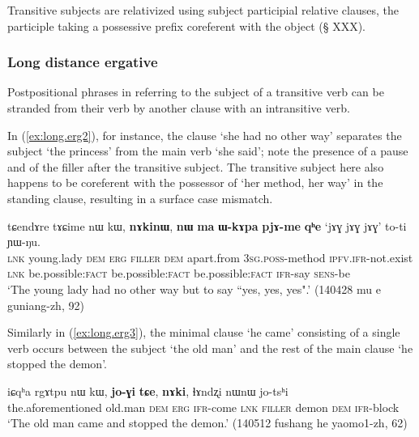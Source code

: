 Transitive subjects are relativized using subject  participial relative clauses, the participle taking a possessive prefix coreferent with the object (§ XXX). 

\subsubsection{Long distance ergative} \label{sec:long.distance.kW}
Postpositional phrases in  referring to the subject of a transitive verb can be stranded from their verb by another clause with an intransitive verb. 

In (\ref{ex:long.erg2}), for instance, the clause   `she had no other way' separates the subject  `the princess' from the main verb  `she said'; note the presence of a pause and of the filler  after the transitive subject. The transitive subject here also happens to be coreferent with the possessor of  `her method, her way' in the standing clause, resulting in a surface case mismatch.

\begin{exe}
\ex \label{ex:long.erg2}
\gll  tɕendɤre tɤɕime nɯ kɯ, \textbf{nɤkinɯ}, \textbf{nɯ} \textbf{ma} \textbf{ɯ-kɤpa} \textbf{pjɤ-me} \textbf{qʰe} `jɤɣ jɤɣ jɤɣ' 	to-ti ɲɯ-ŋu. \\
\textsc{lnk} young.lady \textsc{dem} \textsc{erg} \textsc{filler} \textsc{dem}  apart.from \textsc{3sg.poss}-method \textsc{ipfv.ifr}-not.exist \textsc{lnk} be.possible:\textsc{fact} be.possible:\textsc{fact} be.possible:\textsc{fact} \textsc{ifr}-say \textsc{sens}-be \\
\glt `The young lady had no other way but to say ``yes, yes, yes".' (140428 mu e guniang-zh, 92)
\end{exe}

Similarly in (\ref{ex:long.erg3}), the minimal clause  `he came' consisting of a single verb occurs between the subject  `the old man' and the rest of the main clause  `he stopped the demon'.

\begin{exe}
\ex \label{ex:long.erg3}
\gll   iɕqʰa rgɤtpu nɯ kɯ, \textbf{jo-ɣi} \textbf{tɕe}, \textbf{nɤki}, ɬɤndʐi nɯnɯ jo-tsʰi  \\
the.aforementioned old.man \textsc{dem} \textsc{erg} \textsc{ifr}-come \textsc{lnk} \textsc{filler} demon \textsc{dem} \textsc{ifr}-block \\
\glt `The old man came and stopped the demon.' (140512 fushang he yaomo1-zh, 62)
\end{exe}

